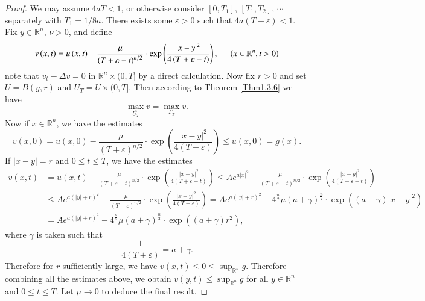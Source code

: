 \begin{proof}
We may assume $4aT<1$, or otherwise consider $[0,T_1]$, $[T_1,T_2]$, $\cdots$ separately with $T_1=1/8a$. There exists some $\varepsilon>0$ such that $4a(T+\varepsilon)<1$. Fix $y\in\mathbb{R}^n$, $\nu>0$, and define 
$$
v\left( x,t \right) =u\left( x,t \right) -\frac{\mu}{\left( T+\varepsilon -t \right) ^{n/2}}\cdot \exp \left( \frac{\left| x-y \right|^2}{4\left( T+\varepsilon -t \right)} \right) ,\hspace{0.5cm}\left( x\in \mathbb{R} ^n,t>0 \right) 
$$
note that $v_t-\Delta v=0$ in $\mathbb{R}^n\times(0,T]$ by a direct calculation. Now fix $r>0$ and set $U=B(y,r)$ and $U_T=U\times(0,T]$. Then according to Theorem \ref{Thm1.3.6} we have 
$$
\max_{\overline{U_T}} v=\max_{\Gamma _T} v.
$$
Now if $x\in\mathbb{R}^n$, we have the estimates 
$$
v\left( x,0 \right) =u\left( x,0 \right) -\frac{\mu}{\left( T+\varepsilon \right) ^{n/2}}\cdot \exp \left( \frac{\left| x-y \right|^2}{4\left( T+\varepsilon \right)} \right) \le u\left( x,0 \right) =g\left( x \right) .
$$
If $|x-y|=r$ and $0\le t\le T$, we have the estimates 
$$
\begin{aligned}
v\left( x,t \right) &=u\left( x,t \right) -\frac{\mu}{\left( T+\varepsilon -t \right) ^{n/2}}\cdot \exp \left( \frac{\left| x-y \right|^2}{4\left( T+\varepsilon -t \right)} \right) \le Ae^{a\left| x \right|^2}-\frac{\mu}{\left( T+\varepsilon -t \right) ^{n/2}}\cdot \exp \left( \frac{\left| x-y \right|^2}{4\left( T+\varepsilon -t \right)} \right) 
\\
&\le Ae^{a\left( \left| y \right|+r \right) ^2}-\frac{\mu}{\left( T+\varepsilon \right) ^{n/2}}\cdot \exp \left( \frac{\left| x-y \right|^2}{4\left( T+\varepsilon \right)} \right) =Ae^{a\left( \left| y \right|+r \right) ^2}-4^{\frac{n}{2}}\mu \left( a+\gamma \right) ^{\frac{n}{2}}\cdot \exp \left( \left( a+\gamma \right) \left| x-y \right|^2 \right) 
\\
&=Ae^{a\left( \left| y \right|+r \right) ^2}-4^{\frac{n}{2}}\mu \left( a+\gamma \right) ^{\frac{n}{2}}\cdot \exp \left( \left( a+\gamma \right) r^2 \right),
\end{aligned}
$$
where $\gamma$ is taken such that 
$$
\frac{1}{4\left( T+\varepsilon \right)}=a+\gamma .
$$
Therefore for $r$ sufficiently large, we have $v(x,t)\le 0\le\sup_{\mathbb{R}^n}g$. Therefore combining all the estimates above, we obtain $v(y,t)\le\sup_{\mathbb{R}^n}g$ for all $y\in\mathbb{R}^n$ and $0\le t\le T$. Let $\mu\to 0$ to deduce the final result.
\end{proof}
